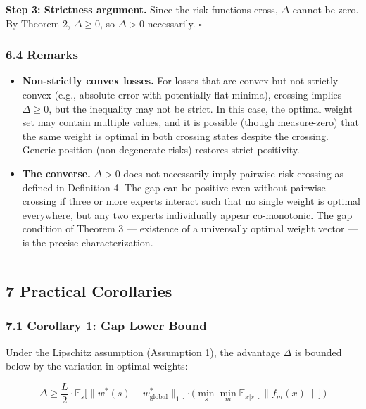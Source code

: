 \documentclass[
  12pt,
]{article}
\begin{document}
\textbf{Step 3: Strictness argument.} Since the risk functions cross,
\(\Delta\) cannot be zero. By Theorem 2, \(\Delta \geq 0\), so
\(\Delta > 0\) necessarily. \(\square\)

\subsubsection{6.4 Remarks}\label{remarks}

\begin{itemize}
\item
  \textbf{Non-strictly convex losses.} For losses that are convex but
  not strictly convex (e.g., absolute error with potentially flat
  minima), crossing implies \(\Delta \geq 0\), but the inequality may
  not be strict. In this case, the optimal weight set may contain
  multiple values, and it is possible (though measure-zero) that the
  same weight is optimal in both crossing states despite the crossing.
  Generic position (non-degenerate risks) restores strict positivity.
\item
  \textbf{The converse.} \(\Delta > 0\) does not necessarily imply
  pairwise risk crossing as defined in Definition 4. The gap can be
  positive even without pairwise crossing if three or more experts
  interact such that no single weight is optimal everywhere, but any two
  experts individually appear co-monotonic. The gap condition of Theorem
  3 --- existence of a universally optimal weight vector --- is the
  precise characterization.
\end{itemize}

\begin{center}\rule{0.5\linewidth}{0.5pt}\end{center}

\subsection{7 Practical Corollaries}\label{practical-corollaries}

\subsubsection{7.1 Corollary 1: Gap Lower
Bound}\label{corollary-1-gap-lower-bound}

Under the Lipschitz assumption (Assumption 1), the advantage \(\Delta\)
is bounded below by the variation in optimal weights:

\[\Delta \geq \frac{L}{2} \cdot \mathbb{E}_s\bigl[\|w^*(s) - w^*_{\text{global}}\|_1\bigr] \cdot \bigl(\min_{s} \min_{m} \mathbb{E}_{x|s}[\|f_m(x)\|]\bigr)\]
\end{document}
